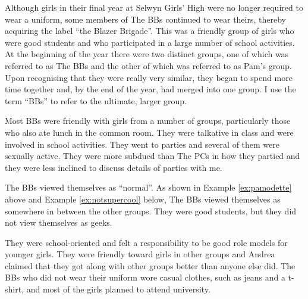 \vspace{5 mm}
 
\noindent Although girls in their final year at Selwyn Girls' High were no longer required to wear a uniform, some members of The BBs continued to wear theirs, thereby acquiring the label ``the Blazer Brigade''. This was a friendly group of girls who were good students and who participated in a large number of school activities. At the beginning of the year there were two distinct groups, one of which was referred to as The BBs and the other of which was referred to as Pam's group. Upon recognising that they were really very similar, they began to spend more time together and, by the end of the year, had merged into one group. I use the term ``BBs'' to refer to the ultimate, larger group. 


Most BBs were friendly with girls from a number of groups, particularly those who also ate lunch in the common room. They were talkative in class and were involved in school activities. They went to parties and several of them were sexually active. They were more subdued than The PCs in how they partied and they were less inclined to discuss details of parties with me. 

The BBs viewed themselves as ``normal''. As shown in Example \ref{ex:pamodette} above and Example \ref{ex:notsupercool} below, The BBs viewed themselves as somewhere in between the other groups. They were good students, but they did not view themselves as geeks.

\label{ex:notsupercool}

\vspace{5 mm}

They were school-oriented and felt a responsibility to be good role models for younger girls. They were friendly toward girls in other groups and Andrea claimed that they got along with other groups better than anyone else did. The BBs who did not wear their uniform wore casual clothes, such as jeans and a t-shirt, and most of the girls planned to attend university. 


